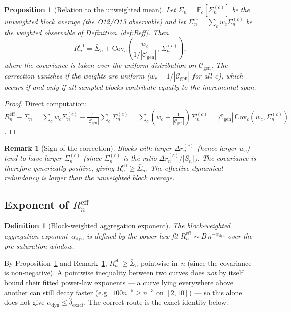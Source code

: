 \documentclass[11pt,a4paper]{article}
\newtheorem{proposition}[theorem]{Proposition}
\newtheorem{definition}[theorem]{Definition}
\newtheorem{remark}[theorem]{Remark}
\newcommand{\Sn}{\bar{\Sigma}_n}
\newcommand{\dexact}{\hat{\delta}_{\mathrm{exact}}}
\newcommand{\Reff}{R_n^{\mathrm{eff}}}
\begin{document}
\begin{proposition}[Relation to the unweighted mean]
\label{prop:relation}
Let $\Sn = \mathbb{E}_c[\Sigma_n^{(c)}]$ be the unweighted block
average (the O12/O13 observable) and let
$\Sigma_n^{w} = \sum_c w_c \Sigma_n^{(c)}$ be the weighted observable
of Definition~\ref{def:Reff}.
Then
\begin{equation}
\label{eq:relation}
\Reff = \Sn + \mathrm{Cov}_c\!\left(
\frac{w_c}{1/|\mathcal{C}_{\mathrm{gen}}|}, \, \Sigma_n^{(c)}
\right),
\end{equation}
where the covariance is taken over the uniform distribution on
$\mathcal{C}_{\mathrm{gen}}$.
The correction vanishes if the weights are uniform
($w_c = 1/|\mathcal{C}_{\mathrm{gen}}|$ for all~$c$), which occurs if and
only if all sampled blocks contribute equally to the incremental span.
\end{proposition}

\begin{proof}
Direct computation:
$\Reff - \Sn
= \sum_c w_c \Sigma_n^{(c)} - \frac{1}{|\mathcal{C}_{\mathrm{gen}}|} \sum_c \Sigma_n^{(c)}
= \sum_c (w_c - \frac{1}{|\mathcal{C}_{\mathrm{gen}}|}) \Sigma_n^{(c)}
= |\mathcal{C}_{\mathrm{gen}}| \, \mathrm{Cov}_c(w_c, \Sigma_n^{(c)})$.
\end{proof}

\begin{remark}[Sign of the correction]
\label{rem:sign}
Blocks with larger $\Delta r_n^{(c)}$ (hence larger $w_c$) tend to
have larger $\Sigma_n^{(c)}$ (since $\Sigma_n^{(c)}$ is the ratio
$\Delta r_n^{(c)} / |S_n|$).
The covariance is therefore generically positive, giving
$\Reff \geq \Sn$.
The effective dynamical redundancy is \emph{larger} than the
unweighted block average.
\end{remark}

\subsection{Exponent of \texorpdfstring{$\Reff$}{R\_eff}}

\begin{definition}[Block-weighted aggregation exponent]
\label{def:alphaeff}
The block-weighted aggregation exponent~$\alpha_{\mathrm{dyn}}$ is defined by the
power-law fit $\Reff \sim B \, n^{-\alpha_{\mathrm{dyn}}}$ over the
pre-saturation window.
\end{definition}

By Proposition~\ref{prop:relation} and Remark~\ref{rem:sign}, $\Reff\geq\Sn$
pointwise in~$n$ (since the covariance is non-negative).
A pointwise inequality between two curves does \emph{not} by itself bound
their fitted power-law exponents — a curve lying everywhere above another
can still decay faster (e.g.\ $100n^{-5}\geq n^{-3}$ on $[2,10]$) — so this
alone does not give $\alpha_{\mathrm{dyn}}\leq\dexact$.
The correct route is the exact identity below.
\end{document}

